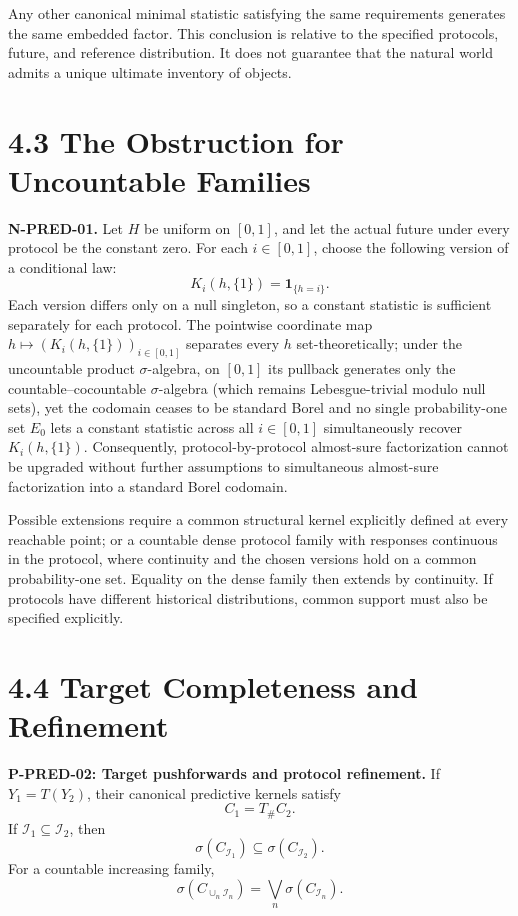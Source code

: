 \documentclass[
  english,
  11pt,
  oneside]{book}
\begin{document}
Any other canonical minimal statistic satisfying the same requirements generates the same embedded factor. This conclusion is relative to the specified protocols, future, and reference distribution. It does not guarantee that the natural world admits a unique ultimate inventory of objects.

\section{4.3 The Obstruction for Uncountable Families}\label{the-obstruction-for-uncountable-families}

\textbf{N-PRED-01.} Let \(H\) be uniform on \([0,1]\), and let the actual future under every protocol be the constant zero. For each \(i\in[0,1]\), choose the following version of a conditional law: \[K_i(h,\{1\})=\mathbf1_{\{h=i\}}.\] Each version differs only on a null singleton, so a constant statistic is sufficient separately for each protocol. The pointwise coordinate map \(h\mapsto(K_i(h,\{1\}))_{i\in[0,1]}\) separates every \(h\) set-theoretically; under the uncountable product \(\sigma\)-algebra, on \([0,1]\) its pullback generates only the countable--cocountable \(\sigma\)-algebra (which remains Lebesgue-trivial modulo null sets), yet the codomain ceases to be standard Borel and no single probability-one set \(E_0\) lets a constant statistic across all \(i\in[0,1]\) simultaneously recover \(K_i(h,\{1\})\). Consequently, protocol-by-protocol almost-sure factorization cannot be upgraded without further assumptions to simultaneous almost-sure factorization into a standard Borel codomain.

Possible extensions require a common structural kernel explicitly defined at every reachable point; or a countable dense protocol family with responses continuous in the protocol, where continuity and the chosen versions hold on a common probability-one set. Equality on the dense family then extends by continuity. If protocols have different historical distributions, common support must also be specified explicitly.

\section{4.4 Target Completeness and Refinement}\label{target-completeness-and-refinement}

\hypertarget{p-pred-02}{}\label{p-pred-02}

\textbf{P-PRED-02: Target pushforwards and protocol refinement.} If \(Y_1=T(Y_2)\), their canonical predictive kernels satisfy \[C_1=T_\#C_2.\] If \(\mathcal I_1\subseteq\mathcal I_2\), then \[\sigma(C_{\mathcal I_1})\subseteq\sigma(C_{\mathcal I_2}).\] For a countable increasing family, \[\sigma(C_{\cup_n\mathcal I_n})=\bigvee_n\sigma(C_{\mathcal I_n}).\]
\end{document}
